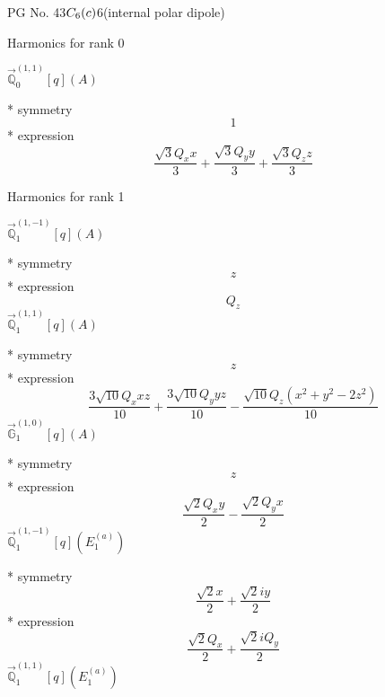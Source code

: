 \documentclass[fleqn,8pt]{jsarticle}
\begin{document}
\setcounter{MaxMatrixCols}{32}

\renewcommand{\tablename}{Table~}
\renewcommand{\figurename}{Figure~}
\begin{center}
\LARGE
PG No. 43\quad$C_{\rm 6}(c)$\quad$6$\quad[ hexagonal ] (internal polar dipole)
\end{center}

\noindent * Harmonics for rank 0

\noindent\quad $\vec{\mathbb{Q}}_{0}^{(1,1)}[q](A)$

\noindent\quad ** symmetry
\begin{dmath*}
1
\end{dmath*}
\noindent\quad ** expression
\begin{dmath*}
\frac{\sqrt{3} Q_{x} x}{3} + \frac{\sqrt{3} Q_{y} y}{3} + \frac{\sqrt{3} Q_{z} z}{3}
\end{dmath*}

\noindent * Harmonics for rank 1

\noindent\quad $\vec{\mathbb{Q}}_{1}^{(1,-1)}[q](A)$

\noindent\quad ** symmetry
\begin{dmath*}
z
\end{dmath*}
\noindent\quad ** expression
\begin{dmath*}
Q_{z}
\end{dmath*}
\noindent\quad $\vec{\mathbb{Q}}_{1}^{(1,1)}[q](A)$

\noindent\quad ** symmetry
\begin{dmath*}
z
\end{dmath*}
\noindent\quad ** expression
\begin{dmath*}
\frac{3 \sqrt{10} Q_{x} x z}{10} + \frac{3 \sqrt{10} Q_{y} y z}{10} - \frac{\sqrt{10} Q_{z} \left(x^{2} + y^{2} - 2 z^{2}\right)}{10}
\end{dmath*}
\noindent\quad $\vec{\mathbb{G}}_{1}^{(1,0)}[q](A)$

\noindent\quad ** symmetry
\begin{dmath*}
z
\end{dmath*}
\noindent\quad ** expression
\begin{dmath*}
\frac{\sqrt{2} Q_{x} y}{2} - \frac{\sqrt{2} Q_{y} x}{2}
\end{dmath*}
\noindent\quad $\vec{\mathbb{Q}}_{1}^{(1,-1)}[q](E_{1}^{(a)})$

\noindent\quad ** symmetry
\begin{dmath*}
\frac{\sqrt{2} x}{2} + \frac{\sqrt{2} i y}{2}
\end{dmath*}
\noindent\quad ** expression
\begin{dmath*}
\frac{\sqrt{2} Q_{x}}{2} + \frac{\sqrt{2} i Q_{y}}{2}
\end{dmath*}
\noindent\quad $\vec{\mathbb{Q}}_{1}^{(1,1)}[q](E_{1}^{(a)})$
\end{document}
